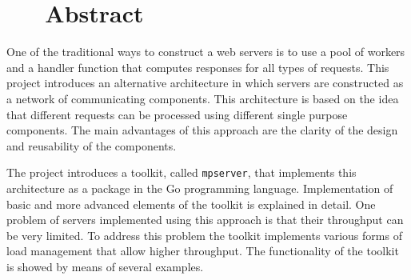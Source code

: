 \section*{\hfil \ \ \ Abstract \hfil}
One of the traditional ways to construct a web servers is to use
a pool of workers and a handler function that computes responses
for all types of requests.
This project introduces an alternative architecture in which 
servers are constructed as a network of communicating components.
This architecture is based on the idea that different requests 
can be processed using different single purpose components.
The main advantages of this approach are the clarity of the design 
and reusability of the components.

The project introduces a toolkit,
called \texttt{mpserver}, that implements this architecture as a 
package in the Go programming language. Implementation of basic and 
more advanced elements of the toolkit is explained in detail. 
One problem of servers implemented using this approach is that 
their throughput can be very limited.
To address this problem the toolkit implements 
various forms of load management that allow higher throughput. 
The functionality of the toolkit is showed by means of several
examples.